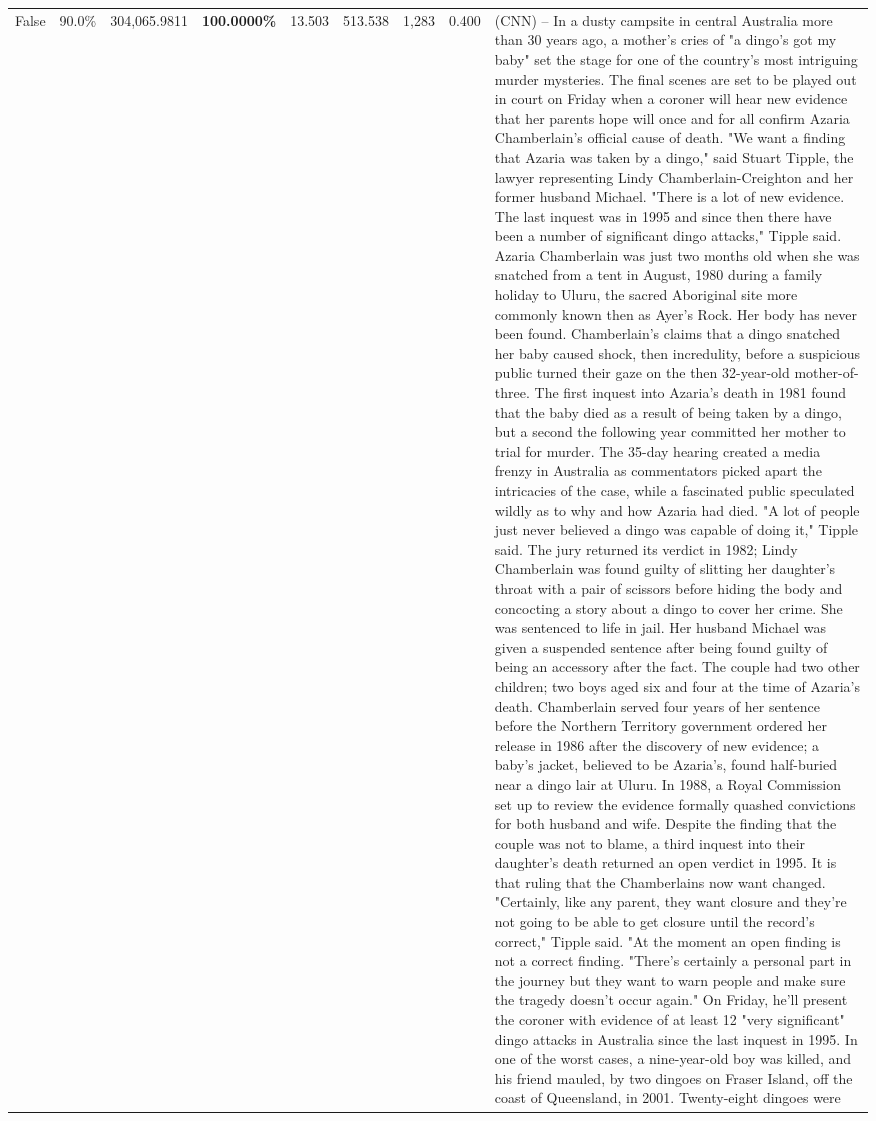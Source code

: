 \begin{table}[H]
\begin{tabular}{lllrlllll}
False & 90.0\% & 304,065.9811 & \bfseries \color{red} 100.0000\% & 13.503 & 513.538 & 1,283 & 0.400 & (CNN) -- In a dusty campsite in central Australia more than 30 years ago, a mother's cries of "a dingo's got my baby" set the stage for one of the country's most intriguing murder mysteries. The final scenes are set to be played out in court on Friday when a coroner will hear new evidence that her parents hope will once and for all confirm Azaria Chamberlain's official cause of death. "We want a finding that Azaria was taken by a dingo," said Stuart Tipple, the lawyer representing Lindy Chamberlain-Creighton and her former husband Michael. "There is a lot of new evidence. The last inquest was in 1995 and since then there have been a number of significant dingo attacks," Tipple said. Azaria Chamberlain was just two months old when she was snatched from a tent in August, 1980 during a family holiday to Uluru, the sacred Aboriginal site more commonly known then as Ayer's Rock. Her body has never been found. Chamberlain's claims that a dingo snatched her baby caused shock, then incredulity, before a suspicious public turned their gaze on the then 32-year-old mother-of-three. The first inquest into Azaria's death in 1981 found that the baby died as a result of being taken by a dingo, but a second the following year committed her mother to trial for murder. The 35-day hearing created a media frenzy in Australia as commentators picked apart the intricacies of the case, while a fascinated public speculated wildly as to why and how Azaria had died. "A lot of people just never believed a dingo was capable of doing it," Tipple said. The jury returned its verdict in 1982; Lindy Chamberlain was found guilty of slitting her daughter's throat with a pair of scissors before hiding the body and concocting a story about a dingo to cover her crime. She was sentenced to life in jail. Her husband Michael was given a suspended sentence after being found guilty of being an accessory after the fact. The couple had two other children; two boys aged six and four at the time of Azaria's death. Chamberlain served four years of her sentence before the Northern Territory government ordered her release in 1986 after the discovery of new evidence; a baby's jacket, believed to be Azaria's, found half-buried near a dingo lair at Uluru. In 1988, a Royal Commission set up to review the evidence formally quashed convictions for both husband and wife. Despite the finding that the couple was not to blame, a third inquest into their daughter's death returned an open verdict in 1995. It is that ruling that the Chamberlains now want changed. "Certainly, like any parent, they want closure and they're not going to be able to get closure until the record's correct," Tipple said. "At the moment an open finding is not a correct finding. "There's certainly a personal part in the journey but they want to warn people and make sure the tragedy doesn't occur again." On Friday, he'll present the coroner with evidence of at least 12 "very significant" dingo attacks in Australia since the last inquest in 1995. In one of the worst cases, a nine-year-old boy was killed, and his friend mauled, by two dingoes on Fraser Island, off the coast of Queensland, in 2001. Twenty-eight dingoes were 
\end{tabular}
\end{table}
